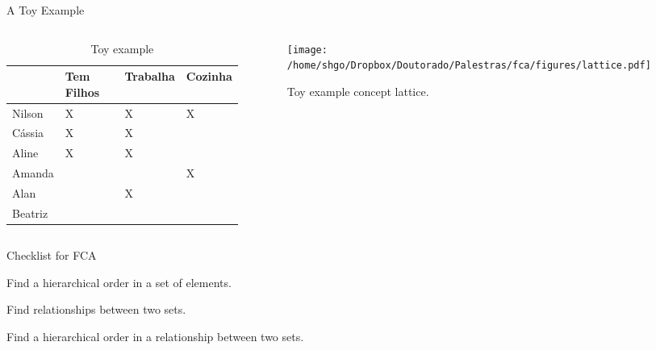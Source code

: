 \documentclass[pdf,xcolor=table]{beamer}
\begin{document}
\begin{frame}[t,label=toy]{A Toy Example}
    \begin{columns}
        \begin{column}{0.5\textwidth}
            \begin{table}[]
            \tiny
            \centering
            \caption{Toy example}
            \begin{tabular}{@{}|l|l|l|l|@{}}
            \hline
                    & Tem Filhos & Trabalha & Cozinha \\\hline
            Nilson  & X          & X        & X       \\\hline
            Cássia  & X          & X        &         \\\hline
            Aline   & X          & X        &         \\\hline
            Amanda  &            &          & X       \\\hline
            Alan    &            & X        &         \\\hline
            Beatriz &            &          &         \\\hline
            \end{tabular}
            \end{table}
        \end{column}
        \begin{column}{0.5\textwidth}
            \begin{figure}[h]
                \texttt{[image: /home/shgo/Dropbox/Doutorado/Palestras/fca/figures/lattice.pdf]}
                \caption{Toy example concept lattice.}
            \end{figure}
        \end{column}
    \end{columns}
\end{frame}

\begin{frame}[t]{Checklist for FCA}
    \begin{todolist}
        \item Find a hierarchical order in a set of elements.
        \item Find relationships between two sets.
        \item Find a hierarchical order in a relationship between two sets.
    \end{todolist}
\end{frame}
\end{document}
